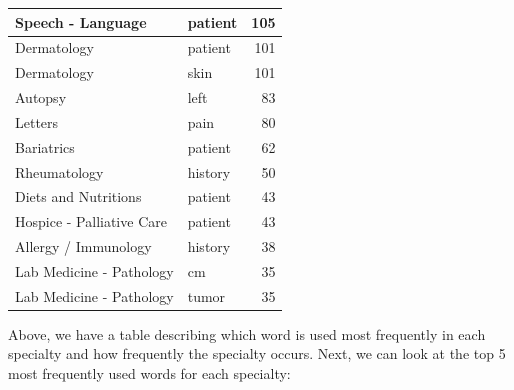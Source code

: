 \documentclass[
]{article}
\newenvironment{Shaded}{\begin{snugshade}}{\end{snugshade}}
\newcommand{\AttributeTok}[1]{\textcolor[rgb]{0.77,0.63,0.00}{#1}}
\newcommand{\DecValTok}[1]{\textcolor[rgb]{0.00,0.00,0.81}{#1}}
\newcommand{\FunctionTok}[1]{\textcolor[rgb]{0.00,0.00,0.00}{#1}}
\newcommand{\NormalTok}[1]{#1}
\newcommand{\SpecialCharTok}[1]{\textcolor[rgb]{0.00,0.00,0.00}{#1}}
\newcommand{\StringTok}[1]{\textcolor[rgb]{0.31,0.60,0.02}{#1}}
\begin{document}
\begin{table}
\begin{tabular}{l|l|r}
\hline
Speech - Language & patient & 105\\
\hline
Dermatology & patient & 101\\
\hline
Dermatology & skin & 101\\
\hline
Autopsy & left & 83\\
\hline
Letters & pain & 80\\
\hline
Bariatrics & patient & 62\\
\hline
Rheumatology & history & 50\\
\hline
Diets and Nutritions & patient & 43\\
\hline
Hospice - Palliative Care & patient & 43\\
\hline
Allergy / Immunology & history & 38\\
\hline
Lab Medicine - Pathology & cm & 35\\
\hline
Lab Medicine - Pathology & tumor & 35\\
\hline
\end{tabular}
\end{table}

Above, we have a table describing which word is used most frequently in
each specialty and how frequently the specialty occurs. Next, we can
look at the top 5 most frequently used words for each specialty:

\begin{Shaded}
\end{Shaded}
\end{document}
